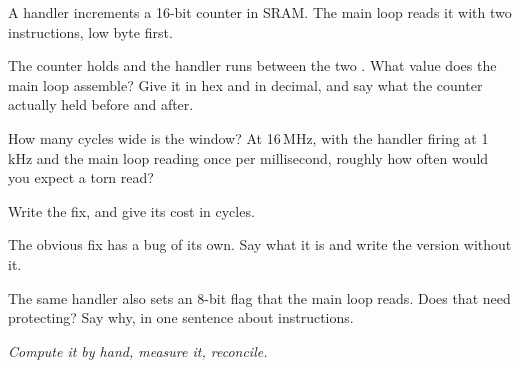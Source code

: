 \label{c3:ex:counter}
A handler increments a 16-bit counter in SRAM. The main loop reads it with two 
instructions, low byte first.
\begin{parts}
  \item The counter holds  and the handler runs between the two . What value
    does the main loop assemble? Give it in hex and in decimal, and say what the counter actually
    held before and after.
  \item How many cycles wide is the window? At 16\,MHz, with the handler firing at 1\,kHz and the
    main loop reading once per millisecond, roughly how often would you expect a torn read?
  \item Write the fix, and give its cost in cycles.
  \item The obvious fix has a bug of its own. Say what it is and write the version without it.
  \item The same handler also sets an 8-bit flag that the main loop reads. Does that need
    protecting? Say why, in one sentence about instructions.
\end{parts}

\label{c3:ex:crosscheck}
\emph{Compute it by hand, measure it, reconcile.}

